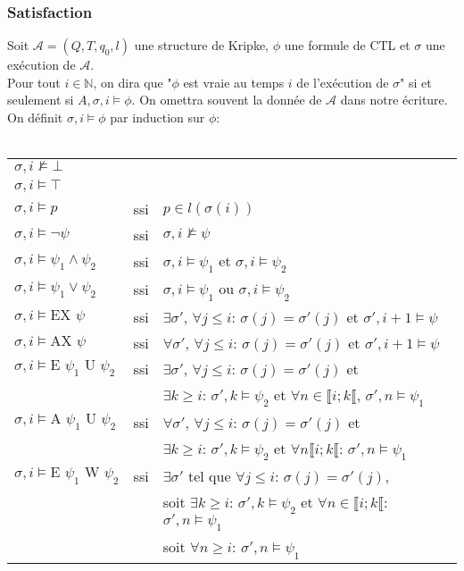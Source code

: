 \documentclass[10pt,a4paper]{article}
\begin{document}
\subsubsection{Satisfaction}
Soit $\mathcal{A} = (Q,T,q_0,l)$ une structure de Kripke, $\phi$ une formule de CTL et $\sigma$ une exécution de $\mathcal{A}$.\\
Pour tout $i \in \mathbb{N}$, on dira que "$\phi$ est vraie au temps $i$ de l'exécution de $\sigma$" si et seulement si $A,\sigma,i \vDash \phi$. On omettra souvent la donnée de $\mathcal{A}$ dans notre écriture.\\
On définit $\sigma,i \vDash \phi$ par induction sur $\phi$:\\
\\
\begin{tabular}{lcl}
$\sigma,i \nvDash \bot$ &&\\
$\sigma,i \vDash \top$ &&\\
$\sigma,i \vDash p$ &ssi& $p \in l (\sigma(i))$\\
$\sigma,i \vDash \neg \psi$ &ssi& $\sigma,i \nvDash \psi$\\
$\sigma,i \vDash \psi_1 \land \psi_2$ &ssi& $\sigma,i \vDash \psi_1$ et $\sigma,i \vDash \psi_2$\\
$\sigma,i \vDash \psi_1 \lor \psi_2$ &ssi& $\sigma,i \vDash \psi_1$ ou $\sigma,i \vDash \psi_2$\\
$\sigma,i \vDash \mbox{EX } \psi$ &ssi& $\exists \sigma'$, $\forall j \leq i$: $\sigma(j) = \sigma'(j)$ et $\sigma',i+1 \vDash \psi$\\
$\sigma,i \vDash \mbox{AX } \psi$ &ssi& $\forall \sigma'$, $\forall j \leq i$: $\sigma(j) = \sigma'(j)$ et $\sigma',i+1 \vDash \psi$\\

$\sigma,i \vDash \mbox{E } \psi_1 \mbox{ U } \psi_2$ &ssi& $\exists \sigma'$, $\forall j \leq i$: $\sigma(j) = \sigma'(j)$ et\\
& & $\exists k \geq i$: $\sigma',k\vDash \psi_2$ et $\forall n \in \llbracket i; k \llbracket$, $\sigma',n \vDash \psi_1$\\

$\sigma,i \vDash \mbox{A } \psi_1 \mbox{ U } \psi_2$ &ssi& $\forall \sigma'$, $\forall j \leq i$: $\sigma(j) = \sigma'(j)$ et\\
& & $\exists k \geq i$: $\sigma',k\vDash \psi_2$ et $\forall n \llbracket i; k \llbracket$: $\sigma',n \vDash \psi_1$\\

$\sigma,i \vDash \mbox{E } \psi_1 \mbox{ W } \psi_2$ &ssi& $\exists \sigma'$ tel que $\forall j \leq i$: $\sigma(j) = \sigma'(j)$,\\
& & soit $\exists k \geq i$: $\sigma',k\vDash \psi_2$ et $\forall n \in \llbracket i; k \llbracket$: $\sigma',n \vDash \psi_1$\\
& & soit $\forall n \geq i$: $\sigma',n \vDash \psi_1$\\


\end{tabular}
\end{document}

